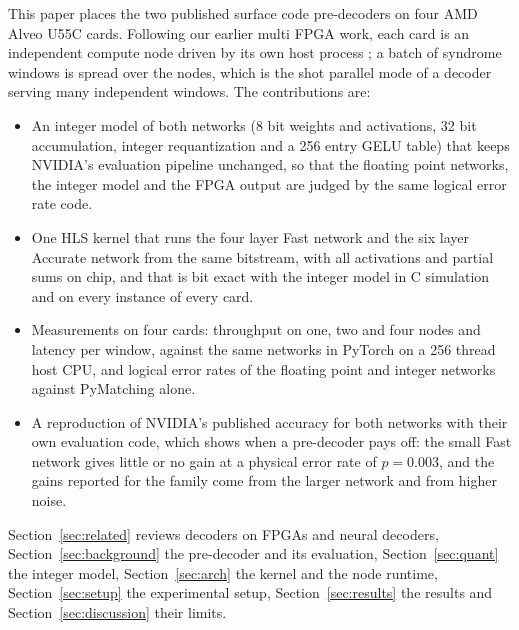 This paper places the two published surface code pre-decoders on four AMD Alveo U55C cards. Following our earlier
multi FPGA work, each card is an independent compute node driven by its own host process \cite{ali2026multifpga}; a
batch of syndrome windows is spread over the nodes, which is the shot parallel mode of a decoder serving many
independent windows. The contributions are:

\begin{itemize}
\item An integer model of both networks (8 bit weights and activations, 32 bit accumulation, integer requantization
and a 256 entry GELU table) that keeps NVIDIA's evaluation pipeline unchanged, so that the floating point networks,
the integer model and the FPGA output are judged by the same logical error rate code.
\item One HLS kernel that runs the four layer Fast network and the six layer Accurate network from the same bitstream,
with all activations and partial sums on chip, and that is bit exact with the integer model in C simulation and on
every instance of every card.
\item Measurements on four cards: throughput on one, two and four nodes and latency per window, against the same
networks in PyTorch on a 256 thread host CPU, and logical error rates of the floating point and integer networks
against PyMatching alone.
\item A reproduction of NVIDIA's published accuracy for both networks with their own evaluation code, which shows when a
pre-decoder pays off: the small Fast network gives little or no gain at a physical error rate of $p=0.003$, and the
gains reported for the family come from the larger network and from higher noise.
\end{itemize}

Section~\ref{sec:related} reviews decoders on FPGAs and neural decoders, Section~\ref{sec:background} the
pre-decoder and its evaluation, Section~\ref{sec:quant} the integer model, Section~\ref{sec:arch} the kernel and the
node runtime, Section~\ref{sec:setup} the experimental setup, Section~\ref{sec:results} the results and
Section~\ref{sec:discussion} their limits.
